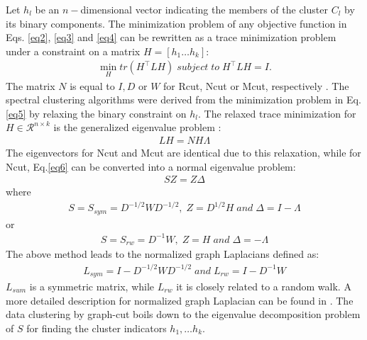 \documentclass[12pt,letterpaper]{article}
\begin{document}
Let $h_l$ be an $n-$dimensional vector indicating the members of the cluster $C_l$ by its binary components. The minimization 
problem of any objective function in Eqs. \ref{eq2}, \ref{eq3} and \ref{eq4} can be rewritten as a trace minimization problem under a 
constraint on a matrix $H = [h_1 \dots h_k]$:
\begin{align}
\min_H tr (H^\top L H) \; subject \;to\;  H^\top L H = I.
\label{eq5}
\end{align}
The matrix $N$ is equal to $I, D$ or $W$ for Rcut, Ncut or Mcut, respectively \citep{ShiMalik2000, Ng2002}. The spectral clustering algorithms were derived from the
minimization problem in Eq. \ref{eq5} by relaxing the binary constraint on $h_l$. The relaxed trace minimization for $H \in \mathcal{R}^{n \times k}$ is the generalized eigenvalue problem \citep{vonLuxburg2007}:
\begin{align}
LH =NH\Lambda
\label{eq6}
\end{align}
The eigenvectors for Ncut and Mcut are identical due to this relaxation, while for Ncut, Eq.\ref{eq6} can be converted into
a normal eigenvalue problem:
\begin{align}
SZ = Z\Delta
\end{align}
where
\begin{align}
S = S_{sym} =  D^{-1/2}WD^{-1/2}, \; Z = D^{1/2} H \; and \; \Delta = I - \Lambda
\end{align}
or
\begin{align}
S=S_{rw} = D^{-1} W, \; Z = H \; and \; \Delta = - \Lambda
\end{align}
The above method leads to the normalized graph Laplacians defined as:
\begin{align}
L_{sym} = I - D^{-1/2}WD^{-1/2} \; and \; L_{rw} = I - D^{-1} W
\end{align}
$L_{sum}$ is a symmetric matrix, while $L_{rw}$ it is closely related to a random walk. A more detailed 
description for normalized graph Laplacian can be found in \citet{Chung1997}.
The data clustering by graph-cut boils down to the eigenvalue decomposition problem of $S$ for finding 
the cluster indicators $h_1, \dots h_k$. %
\end{document}

